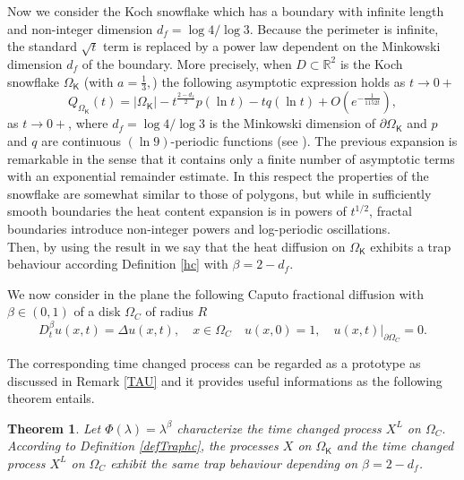 \documentclass[[11pt,a4paper,reqno]{article}
\newcommand{\R}{{\mathbb R}}
\newtheorem{theorem}{Theorem}[section]
\numberwithin{equation}{section}
\begin{document}
Now we consider  the  Koch snowflake which has   a boundary with infinite length and non-integer dimension $d_f=\log 4/\log 3$.
 Because the perimeter is infinite, the standard $\sqrt{t}$ term is replaced by a power law dependent on the Minkowski dimension $d_f$ of the boundary. More precisely, when $D\subset \R^2$ is the  Koch snowflake $ \Omega_\mathsf{K}$ (with $a=\frac13,$) the  following  asymptotic expression holds as $t\to 0+$
$$ 
Q_{\Omega_\mathsf{K}}(t) = |\Omega_\mathsf{K}|-t^{\frac{2-d_f}{2}}p(\ln t) - t q(\ln t) + O(e^{-\frac{1}{1152t}}),$$
 as $t\to 0+$, where $d_f=\log 4/\log 3$ is the Minkowski dimension of $\partial  \Omega_\mathsf{K}$ and $p$ and $q$ are continuous $(\ln 9)$-periodic functions (see \cite{FLV}). The  previous expansion  is remarkable in the sense that it contains only a finite number of asymptotic terms with an exponential remainder estimate.
  In this respect the properties of the snowflake are somewhat similar to those of polygons, but while in sufficiently smooth boundaries the  heat content expansion  is in powers of $t^{1/2}$, fractal boundaries introduce non-integer powers and log-periodic oscillations. \\
  Then, by using the result in  \cite{FLV} we say that the heat diffusion on  $\Omega_\mathsf{K}$ exhibits a trap behaviour  according Definition \ref{hc} with $\beta={2-d_f}.$
  
  
  We  now consider in the plane    the following  Caputo fractional diffusion with  $\beta\in(0,1)$  of a disk  $\Omega_C$ of radius $R$
\begin{equation} \label{CD}
   D_t^{\beta} u(x,t) = \Delta u(x,t), \quad x \in \Omega_C \quad u(x,0)=1, \quad u(x,t)|_{\partial\Omega_C}=0.\end{equation} 

  
  The corresponding time changed process  can be regarded as a prototype  as discussed in Remark \eqref{TAU} and it provides useful informations as the following theorem entails. 
  
  
  \begin{theorem}\label{THC} Let $\Phi(\lambda) = \lambda^{\beta}$ characterize the time changed  process $X^L$  on $ \Omega_C.$
 According to Definition \ref{defTraphc},  the processes $X$ on ${\Omega}_\mathsf{K}$ and  the  time changed process $X^L$  on $ \Omega_C$   exhibit the same trap behaviour depending  on $\beta=2 - d_f$. 
\end{theorem}
\end{document}

